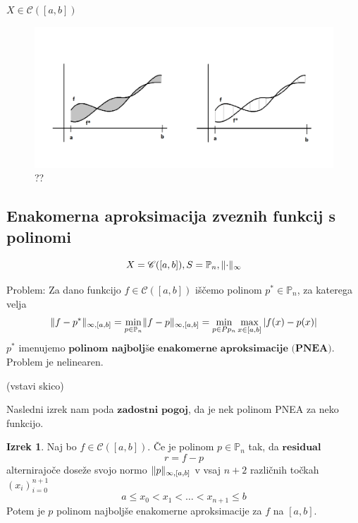 \documentclass[a4paper,12pt]{article}
\DeclarePairedDelimiter\norm{\lVert}{\rVert}
\theoremstyle{definition}
\newtheorem{theorem}[counter]{Izrek}
\theoremstyle{remark}
\newcommand{\Pp}{\mathbb{P}}
\begin{document}
$X \in \mathscr{C}([a, b])$
\begin{figure}[h]
    \center
    \includegraphics[scale=0.25]{mnk_tretja.png}
    \caption{??}
\end{figure}

\subsection{Enakomerna aproksimacija zveznih funkcij s polinomi}
\begin{equation*}
    X = \mathscr{C} ([a, b]), S = \Pp_n, \norm{\cdot}_{\infty}
\end{equation*}

Problem: Za dano funkcijo $f \in \mathscr{C} ([a, b])$ iščemo polinom $p^* \in \Pp_n$, za katerega velja
\begin{equation*}
    \norm{f - p^*}_{\infty, [a, b]} = \min_{p \in \Pp_n} \norm{f - p}_{\infty, [a, b]} = \min_{p \in Pp_n} \max_{x \in [a, b]} \left| f(x) - p(x) \right|
\end{equation*}
$p^*$ imenujemo $\textbf{polinom najboljše enakomerne aproksimacije (PNEA)}$.
Problem je nelinearen.

(vstavi skico)

Nasledni izrek nam poda $\textbf{zadostni pogoj}$, da je nek polinom PNEA za neko funkcijo.
\begin{theorem}
    Naj bo $f \in \mathscr{C}([a, b])$. Če je polinom $p \in \Pp_n$ tak, da $\textbf{residual}$
    \begin{equation}
        r = f - p
    \end{equation}
    alternirajoče doseže svojo normo $\norm{p}_{\infty, [a, b]}$ v vsaj $n + 2$ različnih točkah $(x_i)_{i=0}^{n+1}$
    \[a \leq x_0 < x_1 < \dots < x_{n+1} \leq b\]
    Potem je $p$ polinom najboljše enakomerne aproksimacije za $f$ na $[a, b]$.
\end{theorem}
\end{document}
